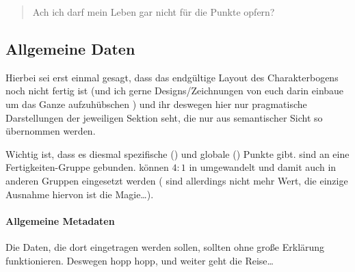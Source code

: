 \label{sec:charakterbogen}\begin{quote}
    Ach ich darf mein Leben gar nicht für die Punkte opfern?
\end{quote}
\subsection{Allgemeine Daten}

Hierbei sei erst einmal gesagt, dass das endgültige Layout des Charakterbogens noch nicht fertig ist (und ich gerne Designs/Zeichnungen von euch darin einbaue um das Ganze aufzuhübschen \Laughey) und ihr deswegen hier nur pragmatische Darstellungen der jeweiligen Sektion seht, die nur aus semantischer Sicht so übernommen werden.

Wichtig ist, dass es diesmal spezifische (\SP{}) und globale (\GP{}) Punkte gibt. \SP{} sind an eine Fertigkeiten-Gruppe gebunden. \SP{} können \(4:1\) in \GP{} umgewandelt und damit auch in anderen Gruppen eingesetzt werden (\GP{} sind allerdings nicht mehr Wert, die einzige Ausnahme hiervon ist die Magie\ldots).%

\paragraph{Allgemeine Metadaten}
\label{par:charMeta}\begin{sccenter}
\end{sccenter}
Die Daten, die dort eingetragen werden sollen, sollten ohne große Erklärung funktionieren. Deswegen hopp hopp, und weiter geht die Reise\ldots

